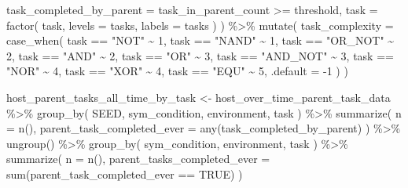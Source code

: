 \documentclass[
]{book}
\newenvironment{Shaded}{\begin{snugshade}}{\end{snugshade}}
\newcommand{\AttributeTok}[1]{\textcolor[rgb]{0.77,0.63,0.00}{#1}}
\newcommand{\ConstantTok}[1]{\textcolor[rgb]{0.00,0.00,0.00}{#1}}
\newcommand{\DecValTok}[1]{\textcolor[rgb]{0.00,0.00,0.81}{#1}}
\newcommand{\FunctionTok}[1]{\textcolor[rgb]{0.00,0.00,0.00}{#1}}
\newcommand{\NormalTok}[1]{#1}
\newcommand{\OtherTok}[1]{\textcolor[rgb]{0.56,0.35,0.01}{#1}}
\newcommand{\SpecialCharTok}[1]{\textcolor[rgb]{0.00,0.00,0.00}{#1}}
\newcommand{\StringTok}[1]{\textcolor[rgb]{0.31,0.60,0.02}{#1}}
\begin{document}
\begin{Shaded}
\begin{Highlighting}[]
    \AttributeTok{task\_completed\_by\_parent =}\NormalTok{ task\_in\_parent\_count }\SpecialCharTok{\textgreater{}=}\NormalTok{ threshold,}
    \AttributeTok{task =} \FunctionTok{factor}\NormalTok{(}
\NormalTok{      task,}
      \AttributeTok{levels =}\NormalTok{ tasks,}
      \AttributeTok{labels =}\NormalTok{ tasks}
\NormalTok{    )}
\NormalTok{  ) }\SpecialCharTok{\%\textgreater{}\%}
  \FunctionTok{mutate}\NormalTok{(}
    \AttributeTok{task\_complexity =} \FunctionTok{case\_when}\NormalTok{(}
\NormalTok{      task }\SpecialCharTok{==} \StringTok{"NOT"} \SpecialCharTok{\textasciitilde{}} \DecValTok{1}\NormalTok{,}
\NormalTok{      task }\SpecialCharTok{==} \StringTok{"NAND"} \SpecialCharTok{\textasciitilde{}} \DecValTok{1}\NormalTok{,}
\NormalTok{      task }\SpecialCharTok{==} \StringTok{"OR\_NOT"} \SpecialCharTok{\textasciitilde{}} \DecValTok{2}\NormalTok{,}
\NormalTok{      task }\SpecialCharTok{==} \StringTok{"AND"} \SpecialCharTok{\textasciitilde{}} \DecValTok{2}\NormalTok{,}
\NormalTok{      task }\SpecialCharTok{==} \StringTok{"OR"} \SpecialCharTok{\textasciitilde{}} \DecValTok{3}\NormalTok{,}
\NormalTok{      task }\SpecialCharTok{==} \StringTok{"AND\_NOT"} \SpecialCharTok{\textasciitilde{}} \DecValTok{3}\NormalTok{,}
\NormalTok{      task }\SpecialCharTok{==} \StringTok{"NOR"} \SpecialCharTok{\textasciitilde{}} \DecValTok{4}\NormalTok{,}
\NormalTok{      task }\SpecialCharTok{==} \StringTok{"XOR"} \SpecialCharTok{\textasciitilde{}} \DecValTok{4}\NormalTok{,}
\NormalTok{      task }\SpecialCharTok{==} \StringTok{"EQU"} \SpecialCharTok{\textasciitilde{}} \DecValTok{5}\NormalTok{,}
      \AttributeTok{.default =} \SpecialCharTok{{-}}\DecValTok{1}
\NormalTok{    )}
\NormalTok{  )}

\NormalTok{host\_parent\_tasks\_all\_time\_by\_task }\OtherTok{\textless{}{-}}\NormalTok{ host\_over\_time\_parent\_task\_data }\SpecialCharTok{\%\textgreater{}\%}
  \FunctionTok{group\_by}\NormalTok{(}
\NormalTok{    SEED,}
\NormalTok{    sym\_condition,}
\NormalTok{    environment,}
\NormalTok{    task}
\NormalTok{  ) }\SpecialCharTok{\%\textgreater{}\%}
  \FunctionTok{summarize}\NormalTok{(}
    \AttributeTok{n =} \FunctionTok{n}\NormalTok{(),}
    \AttributeTok{parent\_task\_completed\_ever =} \FunctionTok{any}\NormalTok{(task\_completed\_by\_parent)}
\NormalTok{  ) }\SpecialCharTok{\%\textgreater{}\%}
  \FunctionTok{ungroup}\NormalTok{() }\SpecialCharTok{\%\textgreater{}\%}
  \FunctionTok{group\_by}\NormalTok{(}
\NormalTok{    sym\_condition,}
\NormalTok{    environment,}
\NormalTok{    task}
\NormalTok{  ) }\SpecialCharTok{\%\textgreater{}\%}
  \FunctionTok{summarize}\NormalTok{(}
    \AttributeTok{n =} \FunctionTok{n}\NormalTok{(),}
    \AttributeTok{parent\_tasks\_completed\_ever =} \FunctionTok{sum}\NormalTok{(parent\_task\_completed\_ever }\SpecialCharTok{==} \ConstantTok{TRUE}\NormalTok{)}
\NormalTok{  )}
\end{Highlighting}
\end{Shaded}
\end{document}
